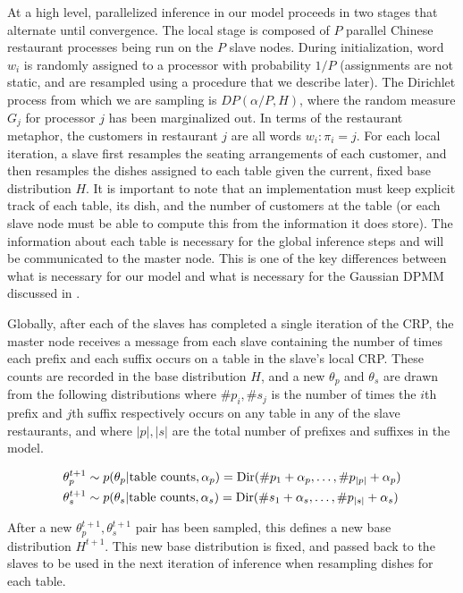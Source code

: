 At a high level, parallelized inference in our model proceeds in two
stages that alternate until convergence. The local stage is composed
of $P$ parallel Chinese restaurant processes being run on the $P$
slave nodes. During initialization, word $w_i$ is randomly assigned to
a processor with probability $1/P$ (assignments are not static, and
are resampled using a procedure that we describe later). The Dirichlet
process from which we are sampling is $DP(\alpha/P, H)$, where the
random measure $G_j$ for processor $j$ has been marginalized out. In
terms of the restaurant metaphor, the customers in restaurant $j$ are
all words $w_i : {\pi_i = j}$. For each local iteration, a slave first
resamples the seating arrangements of each customer, and then
resamples the dishes assigned to each table given the current, fixed
base distribution $H$. It is important to note that an implementation
must keep explicit track of each table, its dish, and the number of
customers at the table (or each slave node must be able to compute
this from the information it does store). The information about each
table is necessary for the global inference steps and will be
communicated to the master node. This is one of the key differences
between what is necessary for our model and what is necessary for the
Gaussian DPMM discussed in \cite{williamson2013}.

Globally, after each of the slaves has completed a single iteration of
the CRP, the master node receives a message from each slave containing
the number of times each prefix and each suffix occurs on a table in
the slave's local CRP. These counts are recorded in the base
distribution $H$, and a new $\theta_p$ and $\theta_s$ are drawn from
the following distributions where $\#p_i, \#s_j$ is the number of
times the $i$th prefix and $j$th suffix respectively occurs on any
table in any of the slave restaurants, and where $|p|, |s|$ are the
total number of prefixes and suffixes in the model.

\begin{align}
  \theta_p^{t+1} & \sim p(\theta_p | \text{table counts}, \alpha_p)
  = \mathrm{Dir}(\#p_1 + \alpha_p, \ldots, \#p_{|p|} + \alpha_p) \\
  \theta_s^{t+1} & \sim p(\theta_s | \text{table counts}, \alpha_s)
  = \mathrm{Dir}(\#s_1 + \alpha_s, \ldots, \#p_{|s|} + \alpha_s)
\end{align}

After a new $\theta_p^{t+1}, \theta_s^{t+1}$ pair has been sampled,
this defines a new base distribution $H^{t+1}$. This new base
distribution is fixed, and passed back to the slaves to be used in the
next iteration of inference when resampling dishes for each table.

